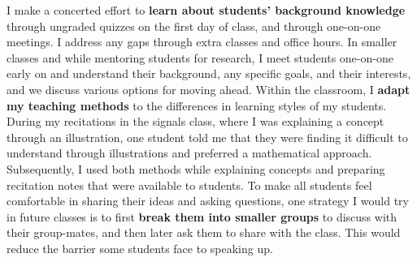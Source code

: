 \documentclass[10pt]{article}
\begin{document}
I make a concerted effort to \textbf{learn about students' background knowledge} through ungraded quizzes on the first day of class, and through one-on-one meetings. I address any gaps through extra classes and office hours. In smaller classes and while mentoring students for research, I meet students one-on-one early on and understand their background, any specific goals, and their interests, and we discuss various options for moving ahead. 
Within the  classroom, I \textbf{adapt my teaching methods} to the differences in learning styles of my students. %
During my recitations in the signals class, where I was explaining a concept through an illustration, one student told me that they were finding it difficult to understand through illustrations and preferred a mathematical approach. Subsequently, I used both methods while explaining concepts and preparing recitation notes that were available to students. %
To make all students feel comfortable in sharing their ideas and asking questions, one strategy I would try in future classes is to first \textbf{break them into smaller groups} to discuss with their group-mates, and then later ask them to share with the class. This would reduce the barrier some students face to speaking up. %
\end{document}
